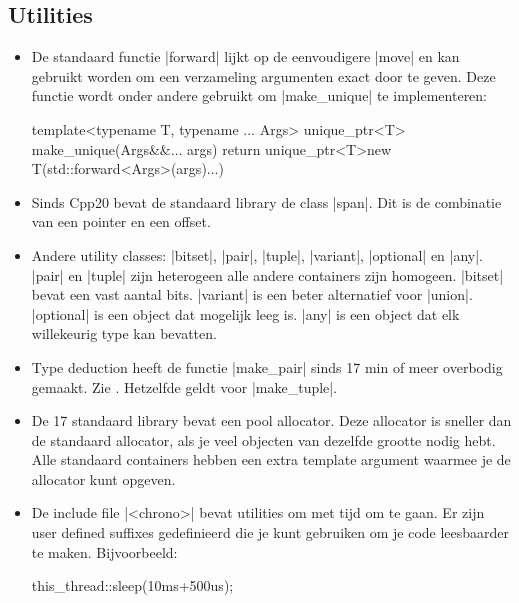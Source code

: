 \begin{cpplstShortInline}
\subsection{Utilities}
\begin{itemize}
	\item 
	De standaard functie |forward| lijkt op de eenvoudigere |move| en kan gebruikt worden om een verzameling argumenten exact door te geven.
	Deze functie wordt onder andere gebruikt om |make_unique| te implementeren:
\begin{cpplstfragment}
template<typename T, typename ... Args>
unique_ptr<T> make_unique(Args&&... args) {
	return unique_ptr<T>{new T(std::forward<Args>(args)...)}
}
\end{cpplstfragment}
	\item 
	Sinds Cpp{}20 bevat de standaard library de class |span|.
	Dit is de combinatie van een pointer en een offset.
	\item 
	Andere utility classes: |bitset|, |pair|, |tuple|, |variant|, |optional| en |any|.
	|pair| en |tuple| zijn heterogeen alle andere containers zijn homogeen.
	|bitset| bevat een vast aantal bits.
	|variant| is een beter alternatief voor |union|.
	|optional| is een object dat mogelijk leeg is.
	|any| is een object dat elk willekeurig type kan bevatten.
	\item 
	Type deduction heeft de functie |make_pair| sinds \Cpp{}17 min of meer overbodig gemaakt.
	Zie .
	Hetzelfde geldt voor |make_tuple|.  
	\item 
	De \Cpp{}17 standaard library bevat een pool allocator.
	Deze allocator is sneller dan de standaard allocator, als je veel objecten van dezelfde grootte nodig hebt.
	Alle standaard containers hebben een extra template argument waarmee je de allocator kunt opgeven.
	\item 
	De include file |<chrono>| bevat utilities om met tijd om te gaan.
	Er zijn user defined suffixes gedefinieerd die je kunt gebruiken om je code leesbaarder te maken.
	Bijvoorbeeld:
\begin{cpplstfragment}
	this_thread::sleep(10ms+500us);
\end{cpplstfragment}
\end{itemize}


\end{cpplstShortInline}
